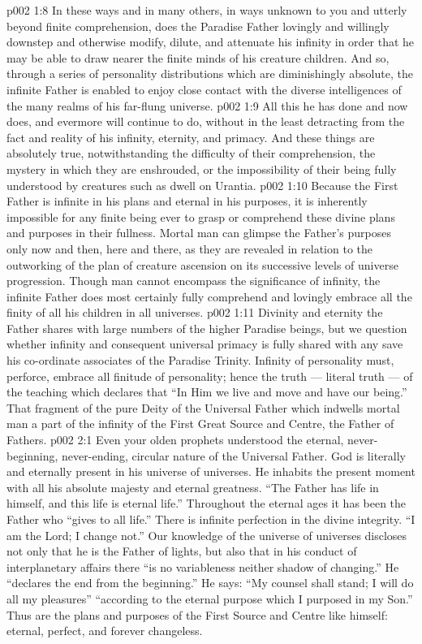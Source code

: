 \vs p002 1:8 In these ways and in many others, in ways unknown to you and utterly beyond finite comprehension, does the Paradise Father lovingly and willingly downstep and otherwise modify, dilute, and attenuate his infinity in order that he may be able to draw nearer the finite minds of his creature children. And so, through a series of personality distributions which are diminishingly absolute, the infinite Father is enabled to enjoy close contact with the diverse intelligences of the many realms of his far\hyp{}flung universe.
\vs p002 1:9 All this he has done and now does, and evermore will continue to do, without in the least detracting from the fact and reality of his infinity, eternity, and primacy. And these things are absolutely true, notwithstanding the difficulty of their comprehension, the mystery in which they are enshrouded, or the impossibility of their being fully understood by creatures such as dwell on Urantia.
\vs p002 1:10 \pc Because the First Father is infinite in his plans and eternal in his purposes, it is inherently impossible for any finite being ever to grasp or comprehend these divine plans and purposes in their fullness. Mortal man can glimpse the Father’s purposes only now and then, here and there, as they are revealed in relation to the outworking of the plan of creature ascension on its successive levels of universe progression. Though man cannot encompass the significance of infinity, the infinite Father does most certainly fully comprehend and lovingly embrace all the finity of all his children in all universes.
\vs p002 1:11 Divinity and eternity the Father shares with large numbers of the higher Paradise beings, but we question whether infinity and consequent universal primacy is fully shared with any save his co\hyp{}ordinate associates of the Paradise Trinity. Infinity of personality must, perforce, embrace all finitude of personality; hence the truth --- literal truth --- of the teaching which declares that “In Him we live and move and have our being.” That fragment of the pure Deity of the Universal Father which indwells mortal man  a part of the infinity of the First Great Source and Centre, the Father of Fathers.
\vs p002 2:1 Even your olden prophets understood the eternal, never\hyp{}beginning, never\hyp{}ending, circular nature of the Universal Father. God is literally and eternally present in his universe of universes. He inhabits the present moment with all his absolute majesty and eternal greatness. “The Father has life in himself, and this life is eternal life.” Throughout the eternal ages it has been the Father who “gives to all life.” There is infinite perfection in the divine integrity. “I am the Lord; I change not.” Our knowledge of the universe of universes discloses not only that he is the Father of lights, but also that in his conduct of interplanetary affairs there “is no variableness neither shadow of changing.” He “declares the end from the beginning.” He says: “My counsel shall stand; I will do all my pleasures” “according to the eternal purpose which I purposed in my Son.” Thus are the plans and purposes of the First Source and Centre like himself: eternal, perfect, and forever changeless.
